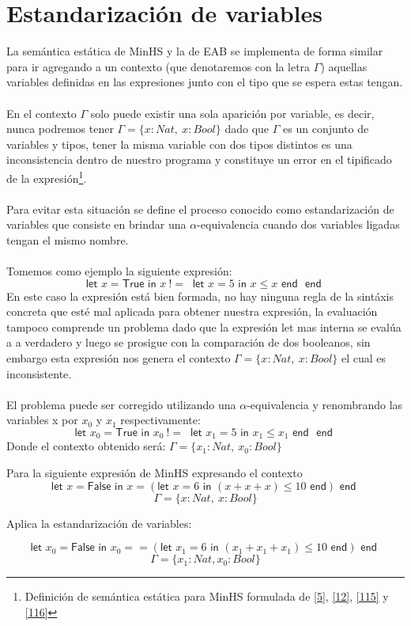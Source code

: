 \section{Estandarización de variables}
La semántica estática de \textsf{MinHS} y la de \textsf{EAB} se implementa de forma similar para ir agregando a un contexto (que denotaremos con la letra $\Gamma$) aquellas variables definidas en las expresiones junto con el tipo que se espera estas tengan.\\\\
En el contexto $\Gamma$ solo puede existir una sola aparición por variable, es decir, nunca podremos tener $\Gamma=\{x : Nat,\ x : Bool\}$ dado que $\Gamma$ es un conjunto de variables y tipos, tener la misma variable con dos tipos distintos es una inconsistencia dentro de nuestro programa y constituye un error en el tipificado de la expresión\footnote{Definición de semántica estática para \textsf{MinHS} formulada de  \hyperlink{5}{[5]},  \hyperlink{12}{[12]}, \hyperlink{115}{[115]} y \hyperlink{116}{[116]}}.\\\\
Para evitar esta situación se define el proceso conocido como estandarización de variables que consiste en brindar una $\alpha$-equivalencia cuando dos variables ligadas tengan el mismo nombre.\\\\
Tomemos como ejemplo la siguiente expresión:
$$ \textsf{let } x = \textsf{True} \textsf{ in } x\ !=\ \textsf{ let } x = 5 \textsf{ in } x \leq x \textsf{ end } \textsf{ end }$$
En este caso la expresión está bien formada, no hay ninguna regla de la sintáxis concreta que esté mal aplicada para obtener nuestra expresión, la evaluación tampoco comprende un problema dado que la expresión \textsf{let} mas interna se evalúa a a verdadero y luego se prosigue con la comparación de dos booleanos, sin embargo esta expresión nos genera el contexto $\Gamma=\{x : Nat,\ x : Bool\}$ el cual es inconsistente.\\\\
El problema puede ser corregido utilizando una $\alpha$-equivalencia y renombrando las variables x por $x_0$ y $x_1$ respectivamente:
$$ \textsf{let } x_0 = \textsf{True} \textsf{ in } x_0\ !=\ \textsf{ let } x_1 = 5 \textsf{ in } x_1 \leq x_1 \textsf{ end } \textsf{ end }$$
Donde el contexto obtenido será: $\Gamma=\{x_1 : Nat,\ x_0 : Bool\}$

\begin{exercise}
    Para la siguiente expresión de \textsf{MinHS} expresando el contexto
    $$\textsf{let } x = \textsf{False} \textsf{ in } x = (\textsf{let } x = 6 \textsf{ in } (x + x + x) \leq 10 \textsf{ end}) \textsf{ end }$$
    $$\Gamma=\{x : Nat,\ x : Bool\}$$
    
    Aplica la estandarización de variables:
    
    $$\textsf{let } x_0 = \textsf{False} \textsf{ in } x_0 == (\textsf{let } x_1 = 6 \textsf{ in } (x_1 + x_1 + x_1) \leq 10 \textsf{ end}) \textsf{ end }$$
    $$\Gamma=\{x_1 : Nat, x_0 : Bool\}$$

\end{exercise} 

